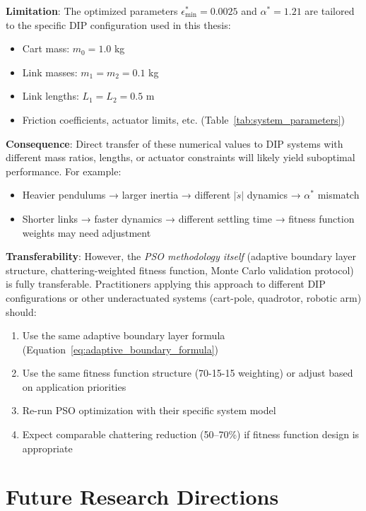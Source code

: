 \textbf{Limitation}: The optimized parameters $\epsilon_{\min}^* = 0.0025$ and $\alpha^* = 1.21$ are tailored to the specific DIP configuration used in this thesis:
\begin{itemize}
    \item Cart mass: $m_0 = 1.0$ kg
    \item Link masses: $m_1 = m_2 = 0.1$ kg
    \item Link lengths: $L_1 = L_2 = 0.5$ m
    \item Friction coefficients, actuator limits, etc. (Table~\ref{tab:system_parameters})
\end{itemize}

\textbf{Consequence}: Direct transfer of these numerical values to DIP systems with different mass ratios, lengths, or actuator constraints will likely yield suboptimal performance. For example:
\begin{itemize}
    \item Heavier pendulums → larger inertia → different $|\dot{s}|$ dynamics → $\alpha^*$ mismatch
    \item Shorter links → faster dynamics → different settling time → fitness function weights may need adjustment
\end{itemize}

\textbf{Transferability}: However, the \textit{PSO methodology itself} (adaptive boundary layer structure, chattering-weighted fitness function, Monte Carlo validation protocol) is fully transferable. Practitioners applying this approach to different DIP configurations or other underactuated systems (cart-pole, quadrotor, robotic arm) should:
\begin{enumerate}
    \item Use the same adaptive boundary layer formula (Equation~\ref{eq:adaptive_boundary_formula})
    \item Use the same fitness function structure (70-15-15 weighting) or adjust based on application priorities
    \item Re-run PSO optimization with their specific system model
    \item Expect comparable chattering reduction (50--70\%) if fitness function design is appropriate
\end{enumerate}

\section{Future Research Directions}
\label{sec:conclusions_future_work}

